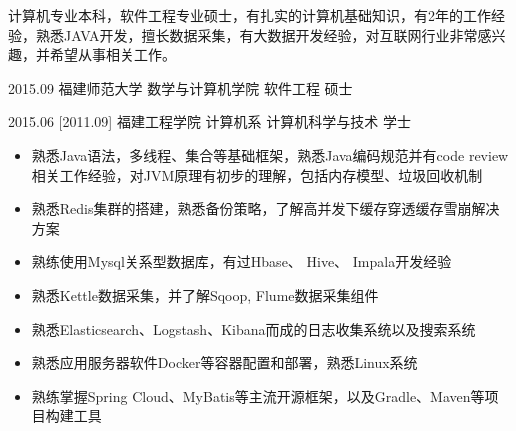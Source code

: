 \documentclass[zh]{resume}
\begin{document}
\makeheader

{\onehalfspacing\hspace{2em}%
计算机专业本科，软件工程专业硕士，有扎实的计算机基础知识，有2年的工作经验，熟悉JAVA开发，擅长数据采集，有大数据开发经验，对互联网行业非常感兴趣，并希望从事相关工作。
\par}

\begin{educations}
    \education%
    {2015.09}%
    {福建师范大学}%
    {数学与计算机学院}%
    {软件工程}%
    {硕士}

  \separator{0.5ex}
  \education%
    {2015.06}%
    [2011.09]%
    {福建工程学院}%
    {计算机系}%
    {计算机科学与技术}%
    {学士}
\end{educations}


\begin{itemize}
  \item 熟悉Java语法，多线程、集合等基础框架，熟悉Java编码规范并有code review相关工作经验，对JVM原理有初步的理解，包括内存模型、垃圾回收机制
  \item 熟悉Redis集群的搭建，熟悉备份策略，了解高并发下缓存穿透缓存雪崩解决方案
  \item 熟练使用Mysql关系型数据库，有过Hbase、 Hive、 Impala开发经验
  \item 熟悉Kettle数据采集，并了解Sqoop, Flume数据采集组件
  \item 熟悉Elasticsearch、Logstash、Kibana而成的日志收集系统以及搜索系统
   \item 熟悉应用服务器软件Docker等容器配置和部署，熟悉Linux系统
  \item 熟练掌握Spring Cloud、MyBatis等主流开源框架，以及Gradle、Maven等项目构建工具
\end{itemize}
\end{document}
